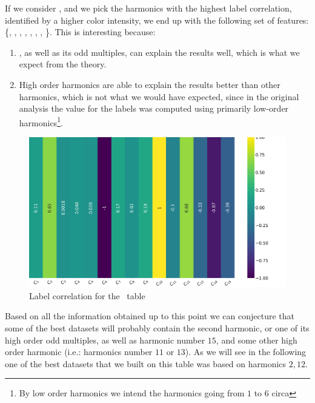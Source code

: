 If we consider , and we pick the harmonics with the highest label correlation,
identified by a higher color intensity, we end up with the following set of features: \{\an[2],
\an[6], \an[10], \an[11], \an[12], \an[13], \an[14], \an[15]\}. This is interesting because:
\begin{enumerate}
	\item \an[2], as well as its odd multiples, can explain the results well, which is what we expect from the theory.
	\item High order harmonics are able to explain the results better than other harmonics,
	      which is not what we would have expected, since in the original analysis the value for the
	      labels was computed using primarily low-order harmonics\footnote{By low order
		      harmonics we intend the harmonics going from $1$ to $6$ circa}.
\end{enumerate}

\begin{figure}
	\centering
	\includegraphics[width=\linewidth]{img/An_label_corr.png}
	\caption{Label correlation for the \an\ table} \label{fig:an-lcorr}
\end{figure}


Based on all the information obtained up to this point we can conjecture that some of the best
datasets will probably contain the second harmonic, or one of its high order odd multiples, as well
as harmonic number $15$, and some other high order harmonic (i.e.: harmonics number $11$ or $13$). As we will see
in the following one of the best datasets that we built on this table was based on harmonics $2, 12$.

